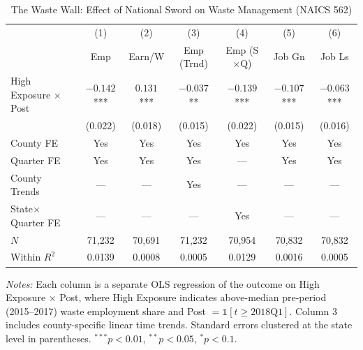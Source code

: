 \begin{table}[t]
\centering
\caption{The Waste Wall: Effect of National Sword on Waste Management (NAICS 562)}
\label{tab:main}
\begin{threeparttable}
\footnotesize
\begin{tabular}{lcccccc}
\hline\hline
 & (1) & (2) & (3) & (4) & (5) & (6) \\
 & Emp & Earn/W & Emp (Trnd) & Emp (S$\times$Q) & Job Gn & Job Ls \\
\hline
High Exposure $\times$ Post & $-0.142$*** & $0.131$*** & $-0.037$** & $-0.139$*** & $-0.107$*** & $-0.063$*** \\
 & (0.022) & (0.018) & (0.015) & (0.022) & (0.015) & (0.016) \\
\hline
County FE & Yes & Yes & Yes & Yes & Yes & Yes \\
Quarter FE & Yes & Yes & Yes & --- & Yes & Yes \\
County Trends & --- & --- & Yes & --- & --- & --- \\
State$\times$Quarter FE & --- & --- & --- & Yes & --- & --- \\
\hline
$N$ & 71,232 & 70,691 & 71,232 & 70,954 & 70,832 & 70,832 \\
Within $R^2$ & 0.0139 & 0.0008 & 0.0005 & 0.0129 & 0.0016 & 0.0005 \\
\hline\hline
\end{tabular}
\begin{tablenotes}
\item \textit{Notes:} Each column is a separate OLS regression of the outcome on High Exposure $\times$ Post, where High Exposure indicates above-median pre-period (2015--2017) waste employment share and Post $= \mathbb{1}[t \geq 2018\text{Q1}]$. Column 3 includes county-specific linear time trends. Standard errors clustered at the state level in parentheses. $^{***}p<0.01$, $^{**}p<0.05$, $^{*}p<0.1$.
\end{tablenotes}
\end{threeparttable}
\end{table}
